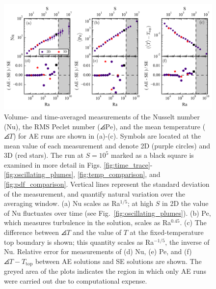 \begin{figure}[ht!]
\vspace{-1.5cm}
\includegraphics[width=\textwidth]{./figs/parameter_space_comparison.pdf}
\caption[Parameter space comparison of AE and SE values]
{Volume- and time-averaged measurements of the Nusselt number (Nu), the
RMS Peclet number ($\angles{\text{Pe}}$), and the mean temperature ($\angles{T}$) for AE runs are shown in (a)-(c).
Symbols are located at the mean value of
each measurement and denote 2D (purple circles) and 3D (red stars). 
The run at $S = 10^5$ marked as a
black square is examined in more detail in Figs. \ref{fig:time_trace}-\ref{fig:oscillating_plumes},
\ref{fig:temp_comparison}, and \ref{fig:pdf_comparison}.
Vertical lines represent the standard deviation of the measurement,
and quantify natural variation over the averaging window. 
(a) Nu scales as Ra$^{1/5}$; at high $S$ in 2D the value of Nu fluctuates over time
(see Fig.~\ref{fig:oscillating_plumes}).  
(b) Pe, which measures turbulence in the solution, scales as
Ra$^{0.45}$. (c) The difference between $\angles{T}$ and the value of $T$ at the fixed-temperature
top boundary is shown; this quantity scales as Ra$^{-1/5}$, the inverse of Nu.
Relative error for measurements of (d) Nu, (e) Pe, and (f) $\angles{T} - T_{\text{top}}$ between 
AE solutions and SE solutions are shown.
The greyed area of the plots indicates the region in which only AE runs were
carried out due to computational expense. \label{fig:parameter_space_comparison} }
\end{figure}




